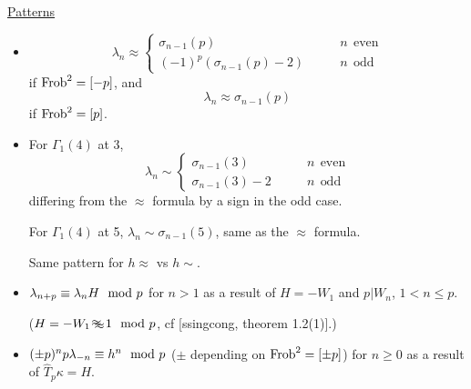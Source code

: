 \documentclass{rs}
\theoremstyle{definition}
\theoremstyle{remark}
\newcommand{\Frob}{{\rm Frob}}
\newcommand{\md}{~~{\rm mod}~}
\newcommand{\G}{\Gamma}
\newcommand{\K}{\kappa}
\renewcommand{\l}{\lambda}
\newcommand{\si}{\sigma}
\newcommand{\Ht}{\widehat{T}}
\renewcommand{\=}{\approx}
\renewcommand{\-}{\sim}
\numberwithin{equation}{section}
\numberwithin{thm}{section}
\begin{document}
\underline{Patterns}
\begin{itemize}
 \item 
 \[
  \l_n \= \left\{
  \begin{array}{ll}
   \si_{n-1}(p) & \qquad n~~\text{even} \\
   (-1)^p (\si_{n-1}(p) - 2) & \qquad n~~\text{odd} 
  \end{array}
  \right.
 \]
 if $\Frob^2 = [-p]$, and 
 \[
  \l_n \= \si_{n-1}(p) 
 \]
 if $\Frob^2 = [p]$.  

 \item For $\G_1(4)$ at 3, 
 \[
  \l_n \- \left\{
  \begin{array}{ll}
   \si_{n-1}(3) & \qquad n~~\text{even} \\
   \si_{n-1}(3) - 2 & \qquad n~~\text{odd} 
  \end{array}
  \right.
 \]
 differing from the $\=$ formula by a sign in the odd case.  

 For $\G_1(4)$ at 5, $\l_n \- \si_{n-1}(5)$, same as the $\=$ formula.  

 Same pattern for $h \=$ vs $h \-$.  

 \item $\l_{n+p} \equiv \l_n H \md p$ for $n > 1$ 
 as a result of $H = -W_1$ and $p | W_n$, $1 < n \leq p$.  

 ($H = -W_1 
 ~\raisebox{-1.2 pt}{$\=$} \hspace{-.14 in} \raisebox{1.2 pt}{$\=$}~ 
 1 \md p$, cf [ssingcong, theorem 1.2(1)].)  

 \item $(\pm p)^n p \l_{-n} \equiv h^n \md p$ 
 ($\pm$ depending on $\Frob^2 = [\pm p]$) for $n \geq 0$ 
 as a result of $\Ht_p \K = H$.  
\end{itemize}
\end{document}

